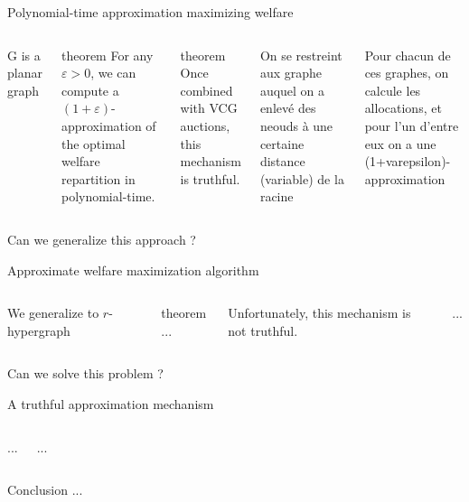 \documentclass[aspectratio=169]{beamer}
\begin{document}
\begin{frame}{Polynomial-time approximation maximizing welfare}
    \begin{columns}
        G is a planar graph 

        \begin{block}{theorem}
            For any $\varepsilon > 0$, we can compute a $(1 + \varepsilon)$-approximation of the optimal welfare repartition in polynomial-time.
        \end{block}
            
        \begin{block}{theorem}
            Once combined with VCG auctions, this mechanism is truthful.
        \end{block}
        
        On se restreint aux graphe auquel on a enlevé des neouds à une certaine distance (variable) de la racine
        
        Pour chacun de ces graphes, on calcule les allocations, et pour l'un d'entre eux on a une (1+varepsilon)-approximation
        
        
    \end{columns}
\end{frame}

\begin{frame}[standout]
    Can we generalize this approach ?
\end{frame}

\begin{frame}{Approximate welfare maximization algorithm}
    \begin{columns}
        We generalize to $r$-hypergraph
        
        \begin{block}{theorem}
            ...
        \end{block}
        
        Unfortunately, this mechanism is not truthful.

        ...
    \end{columns}
\end{frame}

\begin{frame}[standout]
    Can we solve this problem ?
\end{frame}

\begin{frame}{A truthful approximation mechanism}
    \begin{columns}
        ...
        
        ...
    \end{columns}
\end{frame}

\begin{frame}{Conclusion}
    ...
\end{frame}

\end{document}
